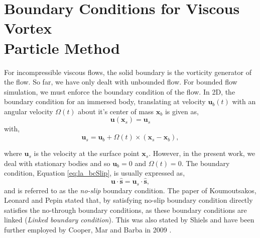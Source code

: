 
\section{Boundary Conditions for Viscous Vortex \\Particle Method}
\label{sec:boundaryConditions}

For incompressible viscous flows, the solid boundary is the vorticity generator of the flow. So far, we have only dealt with unbounded flow. For bounded flow simulation, we must enforce the boundary condition of the flow. In 2D, the boundary condition for an immersed body, translating at velocity $\mathbf{u}_b(t)$ with an angular velocity $\Omega(t)$ about it's center of mass $\mathbf{x}_b$ is given as,
\begin{equation}
\mathbf{u}(\mathbf{x}_s) = \mathbf{u}_s
\label{eq:la_bcSlip}
\end{equation}
with,
\begin{equation}
\mathbf{u}_s = \mathbf{u}_b + \Omega(t) \times (\mathbf{x}_s - \mathbf{x}_b),
\end{equation}

where $\mathbf{u}_s$ is the velocity at the surface point $\mathbf{x}_s$. However, in the present work, we deal with stationary bodies and so $\mathbf{u}_b = 0$ and $\Omega(t) = 0$. The boundary condition, Equation \ref{eq:la_bcSlip}, is usually expressed as,
\begin{equation}
\mathbf{u} \cdot \hat{\mathbf{s}} =  \mathbf{u}_s \cdot \hat{\mathbf{s}},
\end{equation}
and is referred to as the \emph{no-slip} boundary condition. The paper of Koumoutsakos, Leonard and Pepin \cite{Koumoutsakos1994b} stated that, by satisfying no-slip boundary condition directly satisfies the no-through boundary conditions, as these boundary conditions are linked (\emph{Linked boundary condition}). This was also stated by Shiels \cite{Shiels1998} and have been further employed by Cooper, Mar and Barba in 2009 \cite{Cooper2009a}.


